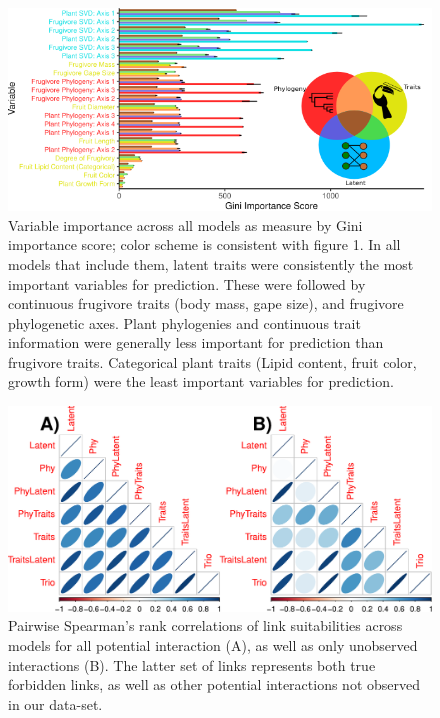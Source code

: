 \documentclass[openacc]{rsproca_new}%
\begin{document}
\begin{figure}%
\centering
\includegraphics[width=\linewidth]{../Figs/Short_Varimportance.png}
\caption{Variable importance across all models as measure by Gini importance score; color scheme is consistent with figure 1. In all models that include them, latent traits were consistently the most important variables for prediction. These were followed by continuous frugivore traits (body mass, gape size), and frugivore phylogenetic axes. Plant phylogenies and continuous trait information were generally less important for prediction than frugivore traits. Categorical plant traits (Lipid content, fruit color, growth form) were the least important variables for prediction.}
\label{fig:Figure_2}
\end{figure}



\clearpage 


\begin{figure}%
\centering
\includegraphics[width=\linewidth]{../Figs/SpearmanCorplot_nolab.pdf}
\caption{Pairwise Spearman's rank correlations of link suitabilities across models for all potential interaction (A), as well as only unobserved interactions (B). The latter set of links represents both true forbidden links, as well as other potential interactions not observed in our data-set.}
\label{fig:Figure_3}
\end{figure}
\end{document}
